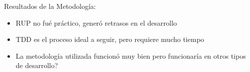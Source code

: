 \begin{frame}{Resultados de la Metodología:\newline}

\begin{itemize}
	
	\pause \item RUP no fué práctico, generó retrasos en el desarrollo
	\pause \item TDD es el proceso ideal a seguir, pero requiere mucho tiempo
	\pause \item La metodología utilizada funcionó muy bien pero funcionaría en otros tipos de desarrollo?
	
\end{itemize}

\end{frame}
